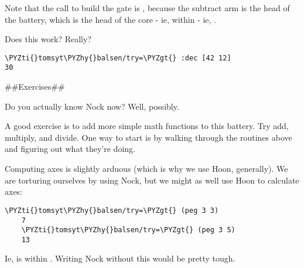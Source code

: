Note that the call to build the gate is \kode{[9 4 0 2]}, because the
subtract arm is the head of the battery, which is the head of the
core - ie,  within  - ie, .

Does this work?  Really?

\begin{framed_shaded}
\begin{Verbatim}[fontsize=\relsize{-2.5},fontseries=b,commandchars=\\\{\}]
\PYZti{}tomsyt\PYZhy{}balsen/try=\PYZgt{} :dec [42 12]
30
\end{Verbatim}
\end{framed_shaded}
\#\#Exercises\#\#

Do you actually know Nock now?  Well, possibly.

A good exercise is to add more simple math functions to this
battery.  Try add, multiply, and divide.  One way to start is by
walking through the routines above and figuring out what they're doing.

Computing axes is slightly arduous (which is why we use Hoon,
generally).  We are torturing ourselves by using Nock, but we
might as well use Hoon to calculate axes:

\begin{framed_shaded}
\begin{Verbatim}[fontsize=\relsize{-2.5},fontseries=b,commandchars=\\\{\}]
    \PYZti{}tomsyt\PYZhy{}balsen/try=\PYZgt{} (peg 3 3)
    7
    \PYZti{}tomsyt\PYZhy{}balsen/try=\PYZgt{} (peg 3 5)
    13
\end{Verbatim}
\end{framed_shaded}
Ie,  is  within .  Writing Nock without this
would be pretty tough.